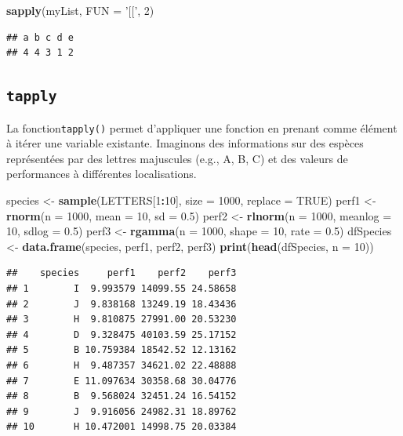 \documentclass[]{book}
\newenvironment{Shaded}{\begin{snugshade}}{\end{snugshade}}
\newcommand{\DataTypeTok}[1]{\textcolor[rgb]{0.13,0.29,0.53}{#1}}
\newcommand{\DecValTok}[1]{\textcolor[rgb]{0.00,0.00,0.81}{#1}}
\newcommand{\FloatTok}[1]{\textcolor[rgb]{0.00,0.00,0.81}{#1}}
\newcommand{\KeywordTok}[1]{\textcolor[rgb]{0.13,0.29,0.53}{\textbf{#1}}}
\newcommand{\NormalTok}[1]{#1}
\newcommand{\OperatorTok}[1]{\textcolor[rgb]{0.81,0.36,0.00}{\textbf{#1}}}
\newcommand{\OtherTok}[1]{\textcolor[rgb]{0.56,0.35,0.01}{#1}}
\newcommand{\StringTok}[1]{\textcolor[rgb]{0.31,0.60,0.02}{#1}}
\begin{document}
\begin{Shaded}
\begin{Highlighting}[]
\KeywordTok{sapply}\NormalTok{(myList, }\DataTypeTok{FUN =} \StringTok{'[['}\NormalTok{, }\DecValTok{2}\NormalTok{)}
\end{Highlighting}
\end{Shaded}

\begin{verbatim}
## a b c d e 
## 4 4 3 1 2
\end{verbatim}

\hypertarget{l17tapply}{%
\subsection{\texorpdfstring{\texttt{tapply}}{tapply}}\label{l17tapply}}

La fonction\texttt{tapply()} permet d'appliquer une fonction en prenant comme élément à itérer une variable existante. Imaginons des informations sur des espèces représentées par des lettres majuscules (e.g., A, B, C) et des valeurs de performances à différentes localisations.

\begin{Shaded}
\begin{Highlighting}[]
\NormalTok{species <-}\StringTok{ }\KeywordTok{sample}\NormalTok{(LETTERS[}\DecValTok{1}\OperatorTok{:}\DecValTok{10}\NormalTok{], }\DataTypeTok{size =} \DecValTok{1000}\NormalTok{, }\DataTypeTok{replace =} \OtherTok{TRUE}\NormalTok{)}
\NormalTok{perf1 <-}\StringTok{ }\KeywordTok{rnorm}\NormalTok{(}\DataTypeTok{n =} \DecValTok{1000}\NormalTok{, }\DataTypeTok{mean =} \DecValTok{10}\NormalTok{, }\DataTypeTok{sd =} \FloatTok{0.5}\NormalTok{)}
\NormalTok{perf2 <-}\StringTok{ }\KeywordTok{rlnorm}\NormalTok{(}\DataTypeTok{n =} \DecValTok{1000}\NormalTok{, }\DataTypeTok{meanlog =} \DecValTok{10}\NormalTok{, }\DataTypeTok{sdlog =} \FloatTok{0.5}\NormalTok{)}
\NormalTok{perf3 <-}\StringTok{ }\KeywordTok{rgamma}\NormalTok{(}\DataTypeTok{n =} \DecValTok{1000}\NormalTok{, }\DataTypeTok{shape =} \DecValTok{10}\NormalTok{, }\DataTypeTok{rate =} \FloatTok{0.5}\NormalTok{)}
\NormalTok{dfSpecies <-}\StringTok{ }\KeywordTok{data.frame}\NormalTok{(species, perf1, perf2, perf3)}
\KeywordTok{print}\NormalTok{(}\KeywordTok{head}\NormalTok{(dfSpecies, }\DataTypeTok{n =} \DecValTok{10}\NormalTok{))}
\end{Highlighting}
\end{Shaded}

\begin{verbatim}
##    species     perf1    perf2    perf3
## 1        I  9.993579 14099.55 24.58658
## 2        J  9.838168 13249.19 18.43436
## 3        H  9.810875 27991.00 20.53230
## 4        D  9.328475 40103.59 25.17152
## 5        B 10.759384 18542.52 12.13162
## 6        H  9.487357 34621.02 22.48888
## 7        E 11.097634 30358.68 30.04776
## 8        B  9.568024 32451.24 16.54152
## 9        J  9.916056 24982.31 18.89762
## 10       H 10.472001 14998.75 20.03384
\end{verbatim}
\end{document}
